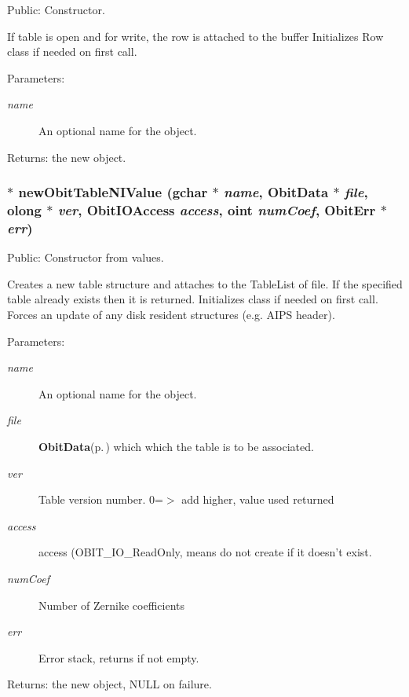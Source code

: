 Public: Constructor. 

If table is open and for write, the row is attached to the buffer Initializes Row class if needed on first call. \begin{Desc}
\item[Parameters:]
\begin{description}
\item[{\em name}]An optional name for the object. \end{description}
\end{Desc}
\begin{Desc}
\item[Returns:]the new object. \end{Desc}
\subsubsection{$\ast$ new\-Obit\-Table\-NIValue (gchar $\ast$ {\em name}, {\bf Obit\-Data} $\ast$ {\em file}, {\bf olong} $\ast$ {\em ver}, Obit\-IOAccess {\em access}, {\bf oint} {\em num\-Coef}, {\bf Obit\-Err} $\ast$ {\em err})}\label{ObitTableNI_8h_a12}


Public: Constructor from values. 

Creates a new table structure and attaches to the Table\-List of file. If the specified table already exists then it is returned. Initializes class if needed on first call. Forces an update of any disk resident structures (e.g. AIPS header). \begin{Desc}
\item[Parameters:]
\begin{description}
\item[{\em name}]An optional name for the object. \item[{\em file}]{\bf Obit\-Data}{\rm (p.\,\pageref{structObitData})} which which the table is to be associated. \item[{\em ver}]Table version number. 0=$>$ add higher, value used returned \item[{\em access}]access (OBIT\_\-IO\_\-Read\-Only, means do not create if it doesn't exist. \item[{\em num\-Coef}]Number of Zernike coefficients \item[{\em err}]Error stack, returns if not empty. \end{description}
\end{Desc}
\begin{Desc}
\item[Returns:]the new object, NULL on failure. \end{Desc}
